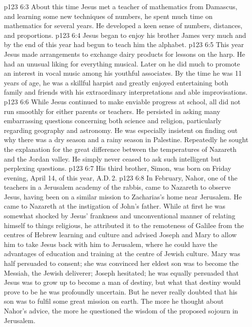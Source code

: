 \vs p123 6:3 About this time Jesus met a teacher of mathematics from Damascus, and learning some new techniques of numbers, he spent much time on mathematics for several years. He developed a keen sense of numbers, distances, and proportions.
\vs p123 6:4 Jesus began to enjoy his brother James very much and by the end of this year had begun to teach him the alphabet.
\vs p123 6:5 This year Jesus made arrangements to exchange dairy products for lessons on the harp. He had an unusual liking for everything musical. Later on he did much to promote an interest in vocal music among his youthful associates. By the time he was 11 years of age, he was a skillful harpist and greatly enjoyed entertaining both family and friends with his extraordinary interpretations and able improvisations.
\vs p123 6:6 While Jesus continued to make enviable progress at school, all did not run smoothly for either parents or teachers. He persisted in asking many embarrassing questions concerning both science and religion, particularly regarding geography and astronomy. He was especially insistent on finding out why there was a dry season and a rainy season in Palestine. Repeatedly he sought the explanation for the great difference between the temperatures of Nazareth and the Jordan valley. He simply never ceased to ask such intelligent but perplexing questions.
\vs p123 6:7 \pc His third brother, Simon, was born on Friday evening, April 14, of this year, A.D.\,2.
\vs p123 6:8 \pc In February, Nahor, one of the teachers in a Jerusalem academy of the rabbis, came to Nazareth to observe Jesus, having been on a similar mission to Zacharias’s home near Jerusalem. He came to Nazareth at the instigation of John’s father. While at first he was somewhat shocked by Jesus’ frankness and unconventional manner of relating himself to things religious, he attributed it to the remoteness of Galilee from the centres of Hebrew learning and culture and advised Joseph and Mary to allow him to take Jesus back with him to Jerusalem, where he could have the advantages of education and training at the centre of Jewish culture. Mary was half persuaded to consent; she was convinced her eldest son was to become the Messiah, the Jewish deliverer; Joseph hesitated; he was equally persuaded that Jesus was to grow up to become a man of destiny, but what that destiny would prove to be he was profoundly uncertain. But he never really doubted that his son was to fulfil some great mission on earth. The more he thought about Nahor’s advice, the more he questioned the wisdom of the proposed sojourn in Jerusalem.

